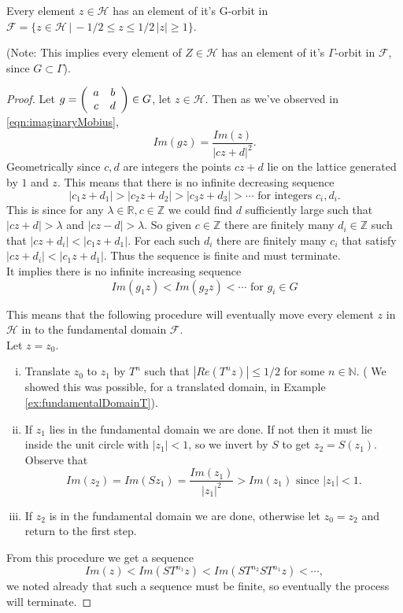 \begin{lemma}\label{lem:gorbitfund}
Every element $z\in \mathcal{H}$ has an element of it's G-orbit in $\mathcal{F} = \{z \in \mathcal{H} \, | \, -1/2 \leq z \leq 1/2 \, |z| \geq 1  \}$.
\end{lemma}
(Note: This implies every element of $Z \in \mathcal{H}$ has an element of it's $\Gamma$-orbit in $\mathcal{F}$, since $G \subset \Gamma$).

\begin{proof}

Let $g  = \left(\begin{array}{ c c } a & b \\ c & d \end{array} \right) \in G$, let $z \in \mathcal{H}$. Then as we've observed in \ref{eqn:imaginaryMobius},
$$ Im(gz) = \frac{Im(z)}{{\vert cz +d \vert}^2}.$$
Geometrically since $c,d$ are integers the points $cz+d$ lie on the lattice generated by $1$ and $z$. 
This means that there is no infinite decreasing sequence 
$$\vert c_1z + d_1  \vert > \vert c_2z + d_2  \vert > \vert c_3z + d_3  \vert  > \cdots  \text{ for integers } c_i,d_i.$$ 
This is since for any $\lambda \in \mathbb{R}, c \in \mathbb{Z}$ we could find $d$ sufficiently large such that $\vert cz + d \vert > \lambda$ and $\vert cz -d \vert > \lambda$. So given $c \in \mathbb{Z}$ there are finitely many $d_i \in \mathbb{Z}$ such that $\vert cz + d_i \vert < \vert c_1z + d_1  \vert$. For each such $d_i$ there are finitely many $c_i$ that satisfy $\vert cz + d_i \vert < \vert c_1z + d_1  \vert$. Thus the sequence is finite and must terminate.
\\
It implies there is no infinite increasing sequence 
$$ Im(g_1z)  < Im(g_2z) < \cdots \text{ for } g_i\in G$$

This means that the following procedure will eventually move every element $z$ in $\mathcal{H}$ in to the fundamental domain $\mathcal{F}$.\\
Let $z = z_0$.
\begin{enumerate}[(i)]
\item Translate $z_0$ to $z_1$ by $T^n$ such that $| Re(T^nz)| \leq 1/2$ for some $n \in \mathbb{N}$. ( We showed this was possible, for a translated domain, in Example \ref{ex:fundamentalDomainT}).
\item If $z_1$ lies in the fundamental domain we are done. If not then it must lie inside the unit circle with $|z_1| < 1$, so we invert by $S$ to get $z_2 = S(z_1)$. Observe that 
$$ Im(z_2) = Im(Sz_1) = \frac{Im(z_1)}{{|z_1|}^2} > Im(z_1) \text{ since } |z_1| < 1.$$
\item If $z_2$ is in the fundamental domain we are done, otherwise let $z_0 = z_2$ and return to the first step.
\end{enumerate}
From this procedure we get a sequence 
$$Im(z) < Im(ST^{n_1}z) < Im(ST^{n_2}ST^{n_1}z) < \cdots,$$
we noted already that such a sequence must be finite, so eventually the process will terminate.
\end{proof}

